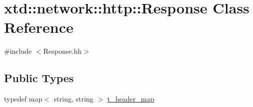 \hypertarget{classxtd_1_1network_1_1http_1_1Response}{\section{xtd\-:\-:network\-:\-:http\-:\-:Response Class Reference}
\label{classxtd_1_1network_1_1http_1_1Response}
}


{\ttfamily \#include $<$Response.\-hh$>$}

\subsection*{Public Types}
\begin{DoxyCompactItemize}
\item 
typedef map$<$ string, string $>$ \hyperlink{classxtd_1_1network_1_1http_1_1Response_a77c534464429597bc4faa6bb556a8b53}{t\-\_\-header\-\_\-map}
\end{DoxyCompactItemize}
